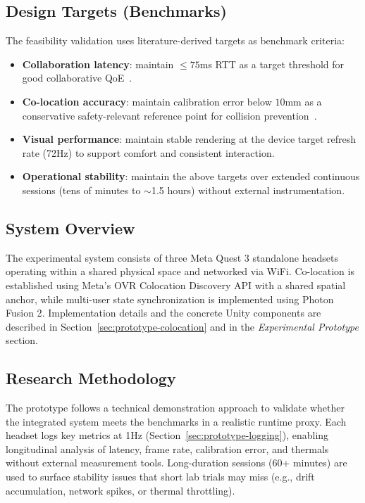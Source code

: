 \documentclass[conference]{IEEEtran}
\begin{document}
\subsection{Design Targets (Benchmarks)}
The feasibility validation uses literature-derived targets as benchmark criteria:
\begin{itemize}
    \item \textbf{Collaboration latency}: maintain $\leq 75$ms RTT as a target threshold for good collaborative QoE~\cite{VanDammeSam2024Iolo}.
    \item \textbf{Co-location accuracy}: maintain calibration error below $10$mm as a conservative safety-relevant reference point for collision prevention~\cite{ReimerDennis2021CfSV}.
    \item \textbf{Visual performance}: maintain stable rendering at the device target refresh rate (72Hz) to support comfort and consistent interaction.
    \item \textbf{Operational stability}: maintain the above targets over extended continuous sessions (tens of minutes to $\sim$1.5 hours) without external instrumentation.
\end{itemize}

\subsection{System Overview}
The experimental system consists of three Meta Quest 3 standalone headsets operating within a shared physical space and networked via WiFi. Co-location is established using Meta's OVR Colocation Discovery API\cite{MetaColocationDiscovery2025} with a shared spatial anchor\cite{MetaSharedSpatialAnchors2025}, while multi-user state synchronization is implemented using Photon Fusion 2\cite{PhotonFusionDocs,MetaMultiplayerBuildingBlocks2025}. Implementation details and the concrete Unity components are described in Section~\ref{sec:prototype-colocation} and in the \textit{Experimental Prototype} section.


\subsection{Research Methodology}
The prototype follows a technical demonstration approach to validate whether the integrated system meets the benchmarks in a realistic runtime proxy. Each headset logs key metrics at 1Hz (Section~\ref{sec:prototype-logging}), enabling longitudinal analysis of latency, frame rate, calibration error, and thermals without external measurement tools. Long-duration sessions (60+ minutes) are used to surface stability issues that short lab trials may miss (e.g., drift accumulation, network spikes, or thermal throttling).
\end{document}
